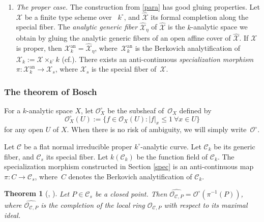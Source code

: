 \documentclass[10pt]{amsart}
\newcommand{\cf}{cf.}
\newtheorem{thm}{Theorem}[section]
\theoremstyle{definition}
\begin{document}
\begin{enumerate}
\item
\emph{The proper case.}
The construction from \eqref{para} has good gluing properties. Let $\mathscr{X}$ be a finite type scheme over ~$k^{\circ}$, and $\widehat{\mathscr{X}}$ its formal completion along the special fiber. The \textit{analytic generic fiber} $\widehat{\mathscr{X}}_\eta$ of $\widehat{\mathscr{X}}$ is the $k$-analytic space we obtain by gluing the analytic generic fibers of an open affine cover of $\widehat{\mathscr{X}}$. If $\mathscr{X}$ is proper, then $\mathscr{X}_k^{\mathrm{an}}=\widehat{\mathscr{X}}_{\eta}$, where~$\mathscr{X}_k^{\mathrm{an}}$ is the Berkovich analytification of $\mathscr{X}_k:=\mathscr{X} \times_{k^{\circ}} k$ (\cf \cite[2.2.2]{muni}). There exists an anti-continuous \textit{specialization morphism} $\pi: \mathscr{X}_k^{\mathrm{an}} \to \mathscr{X}_s$, where $\mathscr{X}_s$ is the special fiber of~$\mathscr{X}$.
\end{enumerate}

\subsubsection{The theorem of Bosch}

For a $k$-analytic space $X$, let $\mathcal{O}^{\circ}_X$ be the subsheaf of~$\mathcal{O}_X$ defined by
\begin{equation} \label{ozero}
\mathcal{O}_X^{\circ}(U):=\{f \in \mathcal{O}_X(U): |f|_x \leqslant 1 \ \forall x \in U\}\end{equation}
for any open $U$ of $X$.
When there is no risk of ambiguity, we will simply write~$\mathcal{O}^{\circ}$.

Let $\mathscr{C}$ be a flat normal irreducible proper $k^{\circ}$-analytic curve. Let $\mathscr{C}_k$ be its generic fiber, and $\mathscr{C}_s$ its special fiber. Let $k(\mathscr{C}_k)$ be the function field of $\mathscr{C}_k$. The specialization morphism constructed in Section \ref{spec} is an anti-continuous map $\pi: C \to \mathscr{C}_s$, where~$C$ denotes the Berkovich analytification of $\mathscr{C}_k$.

\begin{thm}[{\cite[Th.\,5.8]{bo1}, \cite[Th.\,3.1]{mart}}] \label{bosh}
Let $P \in \mathscr{C}_s$ be a closed point. Then $\widehat{\mathcal{O}_{\mathscr{C}, P}}=\mathcal{O}^{\circ}(\pi^{-1}(P))$, where $\widehat{\mathcal{O}_{\mathscr{C}, P}}$ is the completion of the local ring $\mathcal{O}_{\mathscr{C}, P}$ with respect to its maximal ideal.
\end{thm}
\end{document}
